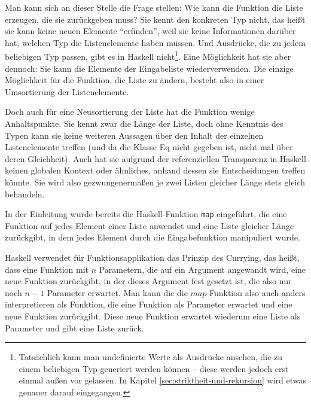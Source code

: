 Man kann sich an dieser Stelle die Frage stellen: Wie kann die Funktion die Liste erzeugen, die sie zurückgeben muss? Sie kennt den konkreten Typ nicht,
das heißt sie kann keine neuen Elemente ``erfinden'', weil sie keine Informationen darüber hat, welchen Typ die Listenelemente haben müssen.
Und Ausdrücke, die zu jedem beliebigen Typ passen, gibt es in Haskell
nicht\footnote{Tatsächlich kann man undefinierte Werte als Ausdrücke ansehen, die zu einem beliebigen Typ generiert werden können --
diese werden jedoch erst einmal außen vor gelassen. In Kapitel \ref{sec:striktheit-und-rekursion} wird etwas genauer darauf eingegangen.}.
Eine Möglichkeit hat sie aber dennoch: Sie kann die Elemente der Eingabeliste wiederverwenden.
Die einzige Möglichkeit für die Funktion, die Liste zu ändern, besteht also in einer Umsortierung der Listenelemente.

Doch auch für eine Neusortierung der Liste hat die Funktion wenige Anhaltspunkte. Sie kennt zwar die Länge der Liste, doch ohne Kenntnis des Typen kann sie keine weiteren Aussagen über den Inhalt der einzelnen Listenelemente treffen (und da die Klasse Eq
nicht gegeben ist, nicht mal über deren Gleichheit). Auch hat sie aufgrund der referenziellen Transparenz %
in Haskell keinen globalen Kontext oder ähnliches, anhand dessen sie Entscheidungen treffen könnte.
Sie wird also gezwungenermaßen je zwei Listen gleicher Länge stets gleich behandeln.

In der Einleitung wurde bereits die Haskell-Funktion \texttt{map} eingeführt, die eine Funktion auf jedes Element einer Liste
anwendet und eine Liste gleicher Länge zurückgibt, in dem jedes Element durch die Eingabefunktion manipuliert wurde.


Haskell verwendet für Funktionsapplikation das Prinzip des Currying, das heißt, dass eine Funktion mit $n$ Parametern, die auf ein
Argument angewandt wird, eine neue Funktion zurückgibt, in der dieses Argument fest gesetzt ist, die also nur noch $n-1$ Parameter erwartet. 
Man kann die die $map$-Funktion also auch anders interpretieren als Funktion, die eine Funktion als Parameter erwartet und eine
neue Funktion zurückgibt. Diese neue Funktion erwartet wiederum eine Liste als Parameter und gibt eine Liste zurück.

